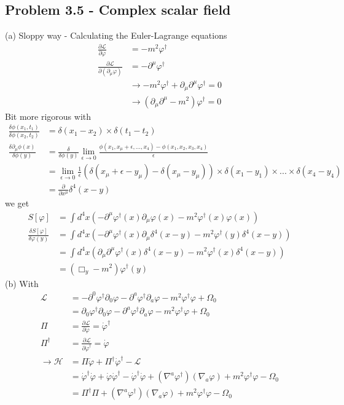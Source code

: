 \documentclass[../main.tex]{subfiles}
\begin{document}
\subsection{Problem 3.5 - Complex scalar field}
(a) Sloppy way - Calculating the Euler-Lagrange equations
\begin{align}
\frac{\partial\mathcal{L}}{\partial\varphi}
&=-m^2\varphi^\dagger\\
\frac{\partial\mathcal{L}}{\partial(\partial_\mu\varphi)}&=-\partial^\mu\varphi^\dagger\\
&\rightarrow -m^2\varphi^\dagger+\partial_\mu\partial^\mu\varphi^\dagger=0\\
&\rightarrow (\partial_\mu\partial^\mu-m^2)\varphi^\dagger=0
\end{align}
Bit more rigorous with
\begin{align}
\frac{\delta\phi(x_1,t_1)}{\delta\phi(x_2,t_2)}&=\delta(x_1-x_2)\times\delta(t_1-t_2)\\
\frac{\delta\partial_\mu\phi(x)}{\delta\phi(y)}&=\frac{\delta}{\delta\phi(y)}\lim_{\epsilon\rightarrow0}\frac{\phi(x_1,x_\mu+\epsilon,...,x_4)-\phi(x_1,x_2,x_3,x_4)}{\epsilon}\\
&=\lim_{\epsilon\rightarrow0}\frac{1}{\epsilon}\left(\delta(x_\mu+\epsilon-y_\mu)-\delta(x_\mu-y_\mu)\right)\times\delta(x_1-y_1)\times...\times\delta(x_4-y_4)\\
&=\frac{\partial}{\partial x^\mu}\delta^4(x-y)
\end{align}
we get
\begin{align}
S[\varphi]
&=\int d^4x\left(-\partial^\mu\varphi^\dagger(x)\partial_\mu\varphi(x)-m^2\varphi^\dagger(x)\varphi(x)\right)\\
\frac{\delta S[\varphi]}{\delta\varphi(y)}
&=\int d^4x\left(-\partial^\mu\varphi^\dagger(x)\partial_\mu\delta^4(x-y)-m^2\varphi^\dagger(y)\delta^4(x-y)\right)\\
&=\int d^4x\left(\partial_\mu\partial^\mu\varphi^\dagger(x)\delta^4(x-y)-m^2\varphi^\dagger(x)\delta^4(x-y)\right)\\
&=(\Box_y-m^2)\varphi^\dagger(y)
\end{align}
(b) With
\begin{align}
\mathcal{L}
&=-\partial^0\varphi^\dagger\partial_0\varphi-\partial^a\varphi^\dagger\partial_a\varphi-m^2\varphi^\dagger\varphi+\Omega_0\\
&=\partial_0\varphi^\dagger\partial_0\varphi-\partial^a\varphi^\dagger\partial_a\varphi-m^2\varphi^\dagger\varphi+\Omega_0\\
\Pi&=\frac{\partial\mathcal{L}}{\partial\dot\varphi}
=\dot\varphi^\dagger\\
\Pi^\dagger&=\frac{\partial\mathcal{L}}{\partial\dot\varphi^\dagger}
=\dot\varphi\\
\rightarrow\mathcal{H}&=\Pi\dot\varphi+\Pi^\dagger\dot\varphi^\dagger-\mathcal{L}\\
&=\dot\varphi^\dagger\dot\varphi+\dot\varphi\dot\varphi^\dagger-\dot\varphi^\dagger\dot\varphi+(\nabla^a\varphi^\dagger)(\nabla_a\varphi)+m^2\varphi^\dagger\varphi-\Omega_0\\
&=\Pi^\dagger\Pi+(\nabla^a\varphi^\dagger)(\nabla_a\varphi)+m^2\varphi^\dagger\varphi-\Omega_0
\end{align}
\end{document}
